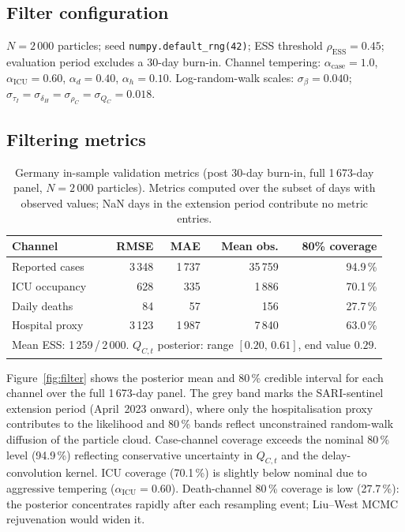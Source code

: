 \documentclass[11pt]{article}
\newcommand{\ESS}{\mathrm{ESS}}
\begin{document}
\subsection{Filter configuration}

$N=2\,000$ particles; seed \texttt{numpy.default\_rng(42)};
ESS threshold $\rho_{\ESS}=0.45$;
evaluation period excludes a 30-day burn-in.
Channel tempering: $\alpha_{\mathrm{case}}=1.0$,
$\alpha_{\mathrm{ICU}}=0.60$, $\alpha_d=0.40$, $\alpha_h=0.10$.
Log-random-walk scales: $\sigma_\beta=0.040$;
$\sigma_{\tau_I}=\sigma_{\delta_H}=\sigma_{\rho_C}=\sigma_{Q_C}=0.018$.

\subsection{Filtering metrics}

\begin{table}[H]
\centering
\caption{Germany in-sample validation metrics (post 30-day burn-in,
         full 1\,673-day panel, $N=2\,000$ particles).
         Metrics computed over the subset of days with observed values;
         NaN days in the extension period contribute no metric entries.}
\begin{tabular}{lrrrr}
\toprule
Channel & RMSE & MAE & Mean obs. & 80\% coverage \\
\midrule
Reported cases   & 3\,348  & 1\,737  & 35\,759 & 94.9\,\% \\
ICU occupancy    &   628   &   335   &  1\,886 & 70.1\,\% \\
Daily deaths     &    84   &    57   &    156  & 27.7\,\% \\
Hospital proxy   & 3\,123  & 1\,987  &  7\,840 & 63.0\,\% \\
\midrule
\multicolumn{5}{l}{\small Mean ESS: 1\,259\,/\,2\,000.
  $Q_{C,t}$ posterior: range $[0.20,\,0.61]$, end value $0.29$.}\\
\bottomrule
\end{tabular}
\label{tab:metrics}
\end{table}

Figure~\ref{fig:filter} shows the posterior mean and 80\,\% credible
interval for each channel over the full 1\,673-day panel.
The grey band marks the SARI-sentinel extension period (April~2023
onward), where only the hospitalisation proxy contributes to the
likelihood and 80\,\% bands reflect unconstrained random-walk
diffusion of the particle cloud.
Case-channel coverage exceeds the nominal 80\,\% level (94.9\,\%)
reflecting conservative uncertainty in $Q_{C,t}$ and the
delay-convolution kernel.
ICU coverage (70.1\,\%) is slightly below nominal due to aggressive
tempering ($\alpha_{\mathrm{ICU}}=0.60$).
Death-channel 80\,\% coverage is low (27.7\,\%): the posterior
concentrates rapidly after each resampling event; Liu--West MCMC
rejuvenation would widen it.
\end{document}
